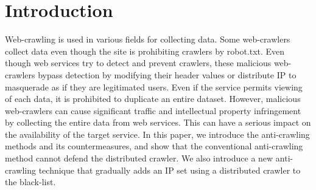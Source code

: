 \documentclass[sigconf,anonymous=false]{acmart}
\begin{document}
%
%
\section{Introduction}
Web-crawling is used in various fields for collecting data. Some web-crawlers collect data even though the site is prohibiting crawlers by robot.txt. Even though web services try to detect and prevent crawlers, these malicious web-crawlers bypass detection by modifying their header values or distribute IP to masquerade as if they are legitimated users.
Even if the service permits viewing of each data, it is prohibited to duplicate an entire dataset. However, malicious web-crawlers can cause significant traffic and intellectual property infringement by collecting the entire data from web services. This can have a serious impact on the availability of the target service.
In this paper, we introduce the anti-crawling methods and its countermeasures, and show that the conventional anti-crawling method cannot defend the distributed crawler. We also introduce a new anti-crawling technique that gradually adds an IP set using a distributed crawler to the black-list.

%
%
\end{document}
